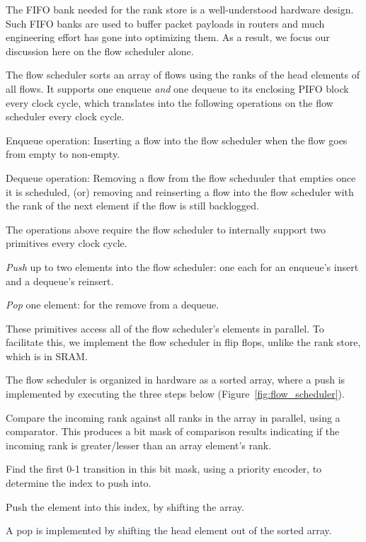 The FIFO bank needed for the rank store is a well-understood hardware design.
Such FIFO banks are used to buffer packet payloads in routers and much
engineering effort has gone into optimizing them.  As a result, we focus our
discussion here on the flow scheduler alone.

The flow scheduler sorts an array of flows using the ranks of the head elements
of all flows. It supports one enqueue {\em and} one dequeue to its enclosing
PIFO block every clock cycle, which translates into the following operations on
the flow scheduler every clock cycle.
\begin{CompactEnumerate}
  \item Enqueue operation: Inserting a flow into the flow scheduler 
  when the flow goes from empty to non-empty.
\item Dequeue operation: Removing a flow from the flow scheduuler that
  empties once it is scheduled, (or) removing and reinserting a flow into
  the flow scheduler with the rank of the
  next element if the flow is still backlogged.
\end{CompactEnumerate}

The operations above require the flow scheduler to internally support two
primitives every clock cycle.
\begin{CompactEnumerate}
\item {\em Push} up to two elements into the flow scheduler: one each for an
  enqueue's insert and a dequeue's reinsert.
\item {\em Pop} one element: for the remove from a dequeue.
\end{CompactEnumerate}
These primitives access all of the flow scheduler's elements in parallel. To
facilitate this, we implement the flow scheduler in flip flops, unlike the rank
store, which is in SRAM.

The flow scheduler is organized in hardware as a sorted array, where a push is
implemented by executing the three steps below
(Figure~\ref{fig:flow_scheduler}).
\begin{CompactEnumerate}
\item Compare the incoming rank against all ranks in the array in parallel, using a comparator.
  This produces a bit mask of comparison results indicating if the incoming rank
  is greater/lesser than an array element's rank.
\item Find the first 0-1 transition in this bit mask, using a priority encoder,
  to determine the index to push into.
\item Push the element into this index, by shifting the array.
\end{CompactEnumerate}
A pop is implemented by shifting the head element out of the sorted array.

